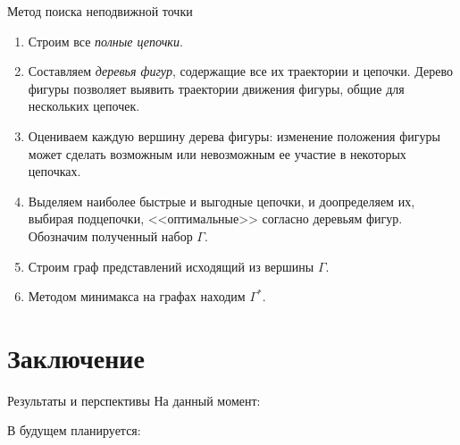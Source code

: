 \documentclass{beamer}
\begin{document}
\begin{frame}{Метод поиска неподвижной точки}
\begin{enumerate}
\item Строим все \emph{полные цепочки}. %
\item Составляем \emph{деревья фигур}, содержащие все их траектории и цепочки. Дерево фигуры позволяет выявить траектории движения фигуры, общие для нескольких цепочек.
\item Оцениваем каждую вершину дерева фигуры: изменение положения фигуры может сделать возможным или невозможным ее участие в некоторых цепочках.
\item Выделяем наиболее быстрые и выгодные цепочки, и доопределяем их, выбирая подцепочки, <<оптимальные>> согласно деревьям фигур. Обозначим полученный набор $\Gamma$.
\item Строим граф представлений исходящий из вершины $\Gamma$.
\item Методом минимакса на графах находим $\Gamma^*$.
\end{enumerate}
\end{frame}




%

\section{Заключение}
\begin{frame}{Результаты и перспективы}
На данный момент:


В будущем планируется:


\end{frame}
\end{document}
